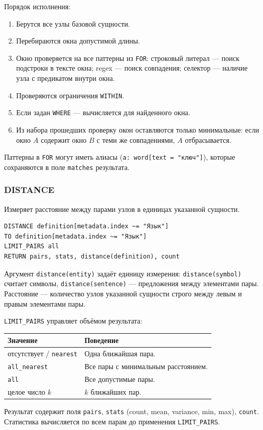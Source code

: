 \documentclass[a4paper,12pt]{article}
\begin{document}
Порядок исполнения:
\begin{enumerate}
  \item Берутся все узлы базовой сущности.
  \item Перебираются окна допустимой длины.
  \item Окно проверяется на все паттерны из \texttt{FOR}: строковый литерал --- поиск подстроки в тексте окна; regex --- поиск совпадения; селектор --- наличие узла с предикатом внутри окна.
  \item Проверяются ограничения \texttt{WITHIN}.
  \item Если задан \texttt{WHERE} --- вычисляется для найденного окна.
  \item Из набора прошедших проверку окон оставляются только минимальные: если окно $A$ содержит окно $B$ с теми же совпадениями, $A$ отбрасывается.
\end{enumerate}

Паттерны в \texttt{FOR} могут иметь алиасы (\texttt{a: word[text = "ключ"]}), которые сохраняются в поле \texttt{matches} результата.

\subsubsection{DISTANCE}

Измеряет расстояние между парами узлов в единицах указанной сущности.

\begin{lstlisting}[language=DiGrDSL]
DISTANCE definition[metadata.index ~= "Язык"]
TO definition[metadata.index ~= "Язык"]
LIMIT_PAIRS all
RETURN pairs, stats, distance(definition), count
\end{lstlisting}

Аргумент \texttt{distance(entity)} задаёт единицу измерения: \texttt{distance(symbol)} считает символы, \texttt{distance(sentence)} --- предложения между элементами пары. Расстояние --- количество узлов указанной сущности строго между левым и правым элементами пары.

\texttt{LIMIT\_PAIRS} управляет объёмом результата:

\begin{table}[h!]
\centering
\small
\begin{tabularx}{\textwidth}{lX}
\toprule
\textbf{Значение}                & \textbf{Поведение} \\
\midrule
отсутствует / \texttt{nearest}   & Одна ближайшая пара. \\
\texttt{all\_nearest}            & Все пары с минимальным расстоянием. \\
\texttt{all}                     & Все допустимые пары. \\
целое число $k$                  & $k$ ближайших пар. \\
\bottomrule
\end{tabularx}
\end{table}

Результат содержит поля \texttt{pairs}, \texttt{stats} (count, mean, variance, min, max), \texttt{count}. Статистика вычисляется по всем парам до применения \texttt{LIMIT\_PAIRS}.
\end{document}
